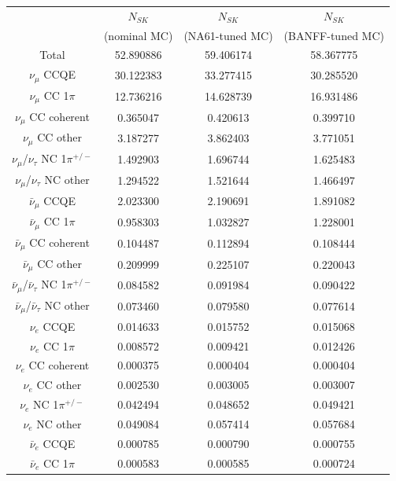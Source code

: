 \begin{table}
\centering
\begin{tabular}{| c | c | c | c | }
\hline
       & $N_{SK}$     & $N_{SK}$              & $N_{SK}$                      \\
       & (nominal MC) & (NA61-tuned MC)  & (BANFF-tuned MC)  \\
\hline
Total & 52.890886 & 59.406174 & 58.367775 \\
\hline
$\nu_\mu$ CCQE &       30.122383 & 33.277415 & 30.285520 \\
$\nu_\mu$ CC 1$\pi$ &       12.736216 & 14.628739 & 16.931486 \\
$\nu_\mu$ CC coherent &        0.365047 & 0.420613 & 0.399710 \\
$\nu_\mu$ CC other &        3.187277 & 3.862403 & 3.771051 \\
$\nu_\mu$/$\nu_\tau$ NC 1$\pi^{+/-}$ &        1.492903 & 1.696744 & 1.625483 \\
$\nu_\mu$/$\nu_\tau$ NC other &        1.294522 & 1.521644 & 1.466497 \\
$\bar{\nu}_{\mu}$ CCQE &        2.023300 & 2.190691 & 1.891082 \\
$\bar{\nu}_{\mu}$ CC 1$\pi$ &        0.958303 & 1.032827 & 1.228001 \\
$\bar{\nu}_{\mu}$ CC coherent &        0.104487 & 0.112894 & 0.108444 \\
$\bar{\nu}_{\mu}$ CC other &        0.209999 & 0.225107 & 0.220043 \\
$\bar{\nu}_{\mu}$/$\bar{\nu}_{\tau}$ NC 1$\pi^{+/-}$ &        0.084582 & 0.091984 & 0.090422 \\
$\bar{\nu}_{\mu}$/$\bar{\nu}_{\tau}$ NC other &        0.073460 & 0.079580 & 0.077614 \\
$\nu_e$ CCQE &        0.014633 & 0.015752 & 0.015068 \\
$\nu_e$ CC 1$\pi$ &        0.008572 & 0.009421 & 0.012426 \\
$\nu_e$ CC coherent &        0.000375 & 0.000404 & 0.000404 \\
$\nu_e$ CC other &        0.002530 & 0.003005 & 0.003007 \\
$\nu_e$ NC 1$\pi^{+/-}$ &        0.042494 & 0.048652 & 0.049421 \\
$\nu_e$ NC other &        0.049084 & 0.057414 & 0.057684 \\
$\bar{\nu}_{e}$ CCQE &        0.000785 & 0.000790 & 0.000755 \\
$\bar{\nu}_{e}$ CC 1$\pi$ &        0.000583 & 0.000585 & 0.000724 \\

\end{tabular}
\end{table}
